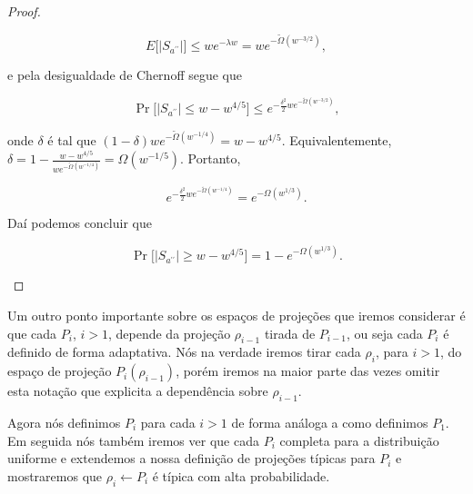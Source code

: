 \begin{proof}
\begin{enumerate}
	\begin{equation*}
		E \big[ \lvert S_{a^{\prime \prime}} \rvert \big] \leq we^{-\lambda w} = we^{-\widetilde{\Omega}(w^{-3/2})},
	\end{equation*}
	
	e pela desigualdade de Chernoff segue que
	
	\begin{equation*}
		\Pr \big[ \lvert S_{a^{\prime \prime}} \rvert \leq w - w^{4/5} \big] \leq e^{-\frac{\delta^{2}}{2}we^{-\widetilde{\Omega}(w^{-3/2})}},
	\end{equation*}
	
	onde $\delta$ é tal que $(1 - \delta)we^{-\widetilde{\Omega}(w^{-1/4})} = w - w^{4/5}$. Equivalentemente, $\delta = 1 - \frac{w - w^{4/5}}{we^{-\widetilde{\Omega}(w^{-1/4})}} = \Omega(w^{-1/5})$. Portanto,
	
	\begin{equation*}
		 e^{-\frac{\delta^{2}}{2}we^{-\widetilde{\Omega}(w^{-1/4})}} = e^{-\Omega(w^{1/3})}.
	\end{equation*}
	
	Daí podemos concluir que
	
	\begin{equation*}
		\Pr \big[ \lvert S_{a^{\prime \prime}} \rvert \geq w - w^{4/5} \big] = 1 - e^{-\Omega(w^{1/3})}.
	\end{equation*}
	
\end{enumerate}

\end{proof}

Um outro ponto importante sobre os espaços de projeções que iremos considerar é que cada $P_{i}$, $i > 1$, depende da projeção $\rho_{i - 1}$ tirada de $P_{i - 1}$, ou seja cada $P_{i}$ é definido de forma adaptativa. Nós na verdade iremos tirar cada $\rho_{i}$, para $i > 1$, do espaço de projeção $P_{i}(\rho_{i - 1})$, porém iremos na maior parte das vezes omitir esta notação que explicita a dependência sobre $\rho_{i - 1}$.

Agora nós definimos $P_{i}$ para cada $i > 1$ de forma análoga a como definimos $P_{1}$. Em seguida nós também iremos ver que cada $P_{i}$ completa para a distribuição uniforme e extendemos a nossa definição de projeções típicas para $P_{i}$ e mostraremos que $\rho_{i} \leftarrow P_{i}$ é típica com alta probabilidade.

